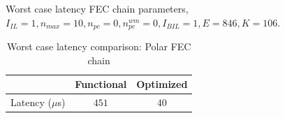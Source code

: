 Worst case latency FEC chain parameters, \newline
$I_{IL} = 1, n_{max} = 10, n_{pc} = 0 ,n_{pc}^{wm} = 0, I_{BIL} = 1, E = 846, K = 106$.
\begin{table}[h]
	\begin{center}
		\caption{Worst case latency comparison: Polar FEC chain}
		\label{tab:worstFecChain}
		\begin{tabular}{c|c|c} %
			\textbf{ } & Functional & Optimized \\
			\hline
			Latency ($\mu$s) & $451$ & $40$\\
		\end{tabular}
	\end{center}
\end{table}

